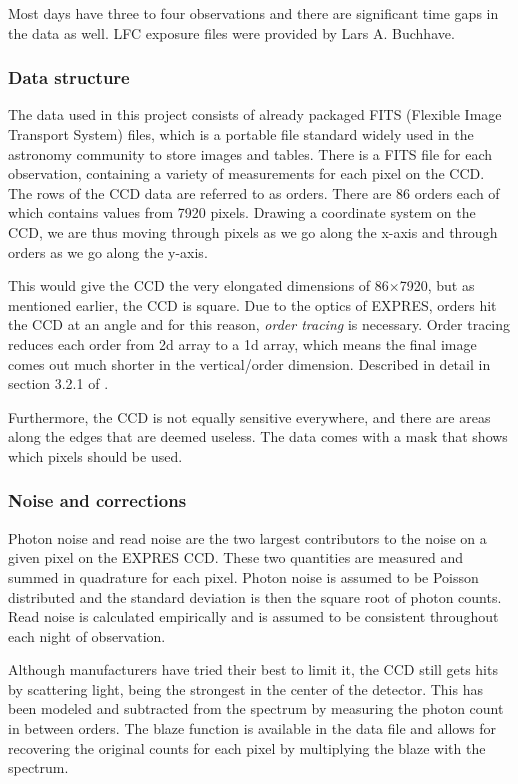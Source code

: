 Most days have three to four observations and there are significant time gaps in the data as well. LFC exposure files were provided by Lars A. Buchhave. 

\subsubsection{Data structure}
The data used in this project consists of already packaged FITS (Flexible Image Transport System) files, which is a portable file standard widely used in the astronomy community to store images and tables. There is a FITS file for each observation, containing a variety of measurements for each pixel on the CCD. The rows of the CCD data are referred to as orders. There are 86 orders each of which contains values from 7920 pixels. Drawing a coordinate system on the CCD, we are thus moving through pixels as we go along the x-axis and through orders as we go along the y-axis.

This would give the CCD the very elongated dimensions of 86$\times$7920, but as mentioned earlier, the CCD is square. Due to the optics of EXPRES, orders hit the CCD at an angle and for this reason, \emph{order tracing} is necessary. Order tracing reduces each order from 2d array to a 1d array, which means the final image comes out much shorter in the vertical/order dimension. Described in detail in section 3.2.1 of \cite{first_RV_from_EXPRES}.

Furthermore, the CCD is not equally sensitive everywhere, and there are areas along the edges that are deemed useless. The data comes with a mask that shows which pixels should be used. 

\subsubsection{Noise and corrections}
Photon noise and read noise are the two largest contributors to the noise on a given pixel on the EXPRES CCD. These two quantities are measured and summed in quadrature for each pixel. Photon noise is assumed to be Poisson distributed and the standard deviation is then the square root of photon counts. Read noise is calculated empirically and is assumed to be consistent throughout each night of observation\cite{first_RV_from_EXPRES}. 

Although manufacturers have tried their best to limit it, the CCD still gets hits by scattering light, being the strongest in the center of the detector. This has been modeled and subtracted from the spectrum by measuring the photon count in between orders. The blaze function is available in the data file and allows for recovering the original counts for each pixel by multiplying the blaze with the spectrum.

